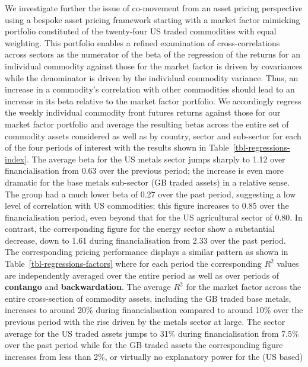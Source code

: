 \documentclass[
  authoryear,
  preprint,
  3p]{elsarticle}
\begin{document}
\medskip

We investigate further the issue of co-movement from an asset pricing
perspective using a bespoke asset pricing framework starting with a
market factor mimicking portfolio constituted of the twenty-four US
traded commodities with equal weighting. This portfolio enables a
refined examination of cross-correlations across sectors as the
numerator of the beta of the regression of the returns for an individual
commodity against those for the market factor is driven by covariances
while the denominator is driven by the individual commodity variance.
Thus, an increase in a commodity's correlation with other commodities
should lead to an increase in its beta relative to the market factor
portfolio. We accordingly regress the weekly individual commodity front
futures returns against those for our market factor portfolio and
average the resulting betas across the entire set of commodity assets
considered as well as by country, sector and sub-sector for each of the
four periods of interest with the results shown in
Table~\ref{tbl-regressions-index}. The average beta for the US metals
sector jumps sharply to 1.12 over financialisation from 0.63 over the
previous period; the increase is even more dramatic for the base metals
sub-sector (GB traded assets) in a relative sense. The group had a much
lower beta of 0.27 over the past period, suggesting a low level of
correlation with US commodities; this figure increases to 0.85 over the
financialisation period, even beyond that for the US agricultural sector
of 0.80. In contrast, the corresponding figure for the energy sector
show a substantial decrease, down to 1.61 during financialisation from
2.33 over the past period.\\
The corresponding pricing performance displays a similar pattern as
shown in Table~\ref{tbl-regressions-factors} where for each period the
corresponding \(R^{2}\) values are independently averaged over the
entire period as well as over periods of \textbf{contango} and
\textbf{backwardation}. The average \(R^{2}\) for the market factor
across the entire cross-section of commodity assets, including the GB
traded base metals, increases to around 20\% during financialisation
compared to around 10\% over the previous period with the rise driven by
the metals sector at large. The sector average for the US traded assets
jumps to 31\% during financialisation from 7.5\% over the past period
while for the GB traded assets the corresponding figure increases from
less than 2\%, or virtually no explanatory power for the (US based)
\end{document}
